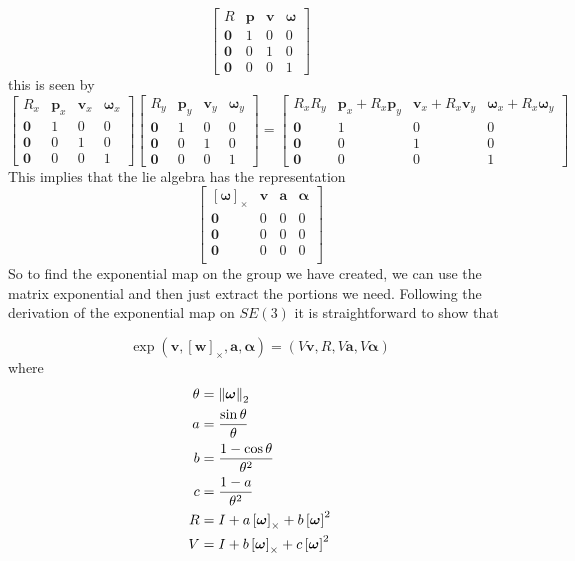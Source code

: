 \documentclass[a4paper]{article}
\begin{document}
\[
  \begin{bmatrix}
    R & \mathbf{p} & \mathbf{v} & \bm{\omega} \\
    \mathbf{0} & 1 & 0 & 0 \\
    \mathbf{0} & 0 & 1 & 0 \\
    \mathbf{0} & 0 & 0 & 1
  \end{bmatrix}
\]
this is seen by
\[
  \begin{bmatrix}
    R_x & \mathbf{p}_x & \mathbf{v}_x & \bm{\omega}_x \\
    \mathbf{0} & 1 & 0 & 0 \\
    \mathbf{0} & 0 & 1 & 0 \\
    \mathbf{0} & 0 & 0 & 1
  \end{bmatrix}
  \begin{bmatrix}
    R_y & \mathbf{p}_y & \mathbf{v}_y & \bm{\omega}_y \\
    \mathbf{0} & 1 & 0 & 0 \\
    \mathbf{0} & 0 & 1 & 0 \\
    \mathbf{0} & 0 & 0 & 1
  \end{bmatrix}
  =
  \begin{bmatrix}
    R_xR_y & \mathbf{p}_x + R_x\mathbf{p}_y & \mathbf{v}_x + R_x\mathbf{v}_y & \bm{\omega}_x + R_x\bm{\omega}_y \\
    \mathbf{0} & 1 & 0 & 0 \\
    \mathbf{0} & 0 & 1 & 0 \\
    \mathbf{0} & 0 & 0 & 1
  \end{bmatrix}
\]
This implies that the lie algebra has the representation
\[
  \begin{bmatrix}
    \left[ \bm{\omega} \right]_\times & \mathbf{v} & \mathbf{a} & \bm{\alpha} \\
    \bm{0} & 0 & 0 & 0 \\
    \bm{0} & 0 & 0 & 0 \\
    \bm{0} & 0 & 0 & 0 \\
  \end{bmatrix}
\]
So to find the exponential map on the group we have created, we can use the matrix exponential and then just extract the portions we need. Following the derivation of the exponential map on $SE(3)$ it  is straightforward to show that

\[
  \exp \left(\mathbf{v}, \left[ \bm{w} \right]_\times, \mathbf{a}, \bm{\alpha} \right) =  (V\mathbf{v}, R, V\mathbf{a}, V \bm{\alpha})
\]
where
\[
  \begin{aligned}
    \theta &= \norm{\bm{\omega}}_2  \\
    a &= \frac{\sin \theta}{\theta} \\
    b &= \frac{1 - \cos \theta}{\theta^2} \\
    c &= \frac{1 - a}{\theta^2} \\
    R &= I + a \left[ \bm{\omega} \right]_\times + b \left[ \bm{\omega} \right]^2 \\
    V &= I + b \left[ \bm{\omega} \right]_\times + c \left[ \bm{\omega} \right]^2 \\
  \end{aligned}
\]
\end{document}
